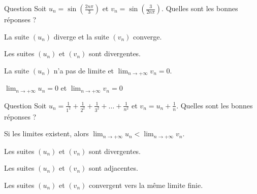 \begin{multi}[multiple,feedback=
{Par continuité de la fonction sinus, on a :
\[\displaystyle \lim _{n\to +\infty}\frac{3}{2n\pi}=0\mbox{ donc }\displaystyle \lim _{n\to +\infty}\sin\left(\frac{2n\pi}{3}\right)=\sin\left(\lim _{n\to +\infty}\frac{3}{2n\pi}\right)=\sin 0=0.\]
Ainsi, \((v_n)\) converge et sa limite est \(0\). Par ailleurs, \[u_{3n}=\sin (2n\pi)=0\mbox{ et }u_{3n+1}=\sin \left(\frac{2\pi}{3}\right)=\frac{\sqrt{3}}{2}.\]
Donc, d'après le théorème des suites extraites, \((u_n)\) diverge ; elle n'a pas de limite.
}]{Question}
Soit \(\displaystyle u_n=\sin\left(\frac{2n\pi}{3}\right)\) et \(\displaystyle v_n=\sin\left(\frac{3}{2n\pi}\right)\). Quelles sont les bonnes réponses ?

    \item* La suite \((u_n)\) diverge et la suite \((v_n)\) converge.
    \item Les suites \((u_n)\) et \((v_n)\) sont divergentes.
    \item* La suite \((u_n)\) n'a pas de limite et \(\displaystyle \lim _{n\to +\infty}v_n=0\).
    \item \(\displaystyle \lim _{n\to +\infty}u_n=0\) et \(\displaystyle \lim _{n\to +\infty}v_n=0\)
\end{multi}


\begin{multi}[multiple,feedback=
{On vérifie que \((u_n)\) est croissante, \((v_n)\) est décroissante et que 
\[\displaystyle \lim _{n\to +\infty}(u_n-v_n)=0.\]
Donc \((u_n)\) et \((v_n)\) sont adjacentes. En conséquence, elles convergent vers la même limite finie.
}]{Question}
Soit \(\displaystyle u_n=\frac{1}{1^2}+\frac{1}{2^2}+\frac{1}{3^2}+\dots+\frac{1}{n^2}\) et \(\displaystyle v_n=u_n+\frac{1}{n}\). Quelles sont les bonnes réponses ?

    \item Si les limites existent, alors \(\displaystyle \lim _{n\to +\infty}u_n<\lim _{n\to +\infty}v_n\).
    \item Les suites \((u_n)\) et \((v_n)\) sont divergentes.
    \item* Les suites \((u_n)\) et \((v_n)\) sont adjacentes.
    \item* Les suites \((u_n)\) et \((v_n)\) convergent vers la même limite finie.
\end{multi}


